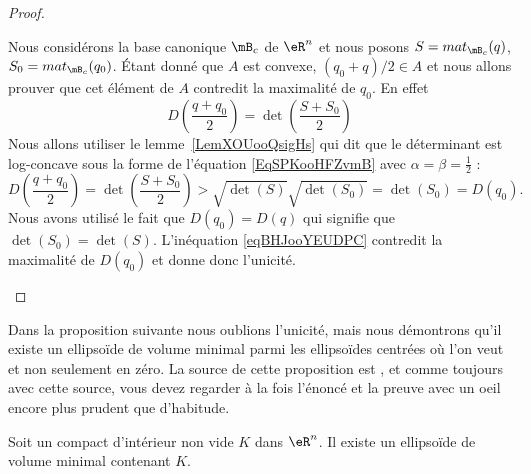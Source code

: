 \begin{proof}
\begin{subproof}
            Nous considérons la base canonique \( \mB_c\) de \( \eR^n\) et nous posons \( S=mat_{\mB_c}(q)\), \( S_0=mat_{\mB_c}(q_0)\). Étant donné que \( A\) est convexe, \( (q_0+q)/2\in A\) et nous allons prouver que cet élément de \( A\) contredit la maximalité de \( q_0\). En effet
            \begin{equation}
                D\left( \frac{ q+q_0 }{ 2 }\right)=\det\left( \frac{ S+S_0 }{2} \right)
            \end{equation}
            Nous allons utiliser le lemme~\ref{LemXOUooQsigHs} qui dit que le déterminant est log-concave sous la forme de l'équation \eqref{EqSPKooHFZvmB} avec \( \alpha=\beta=\frac{ 1 }{2}\) :
            \begin{equation}    \label{eqBHJooYEUDPC}
                D\left( \frac{ q+q_0 }{ 2 }\right)=\det\left( \frac{ S+S_0 }{2} \right)>\sqrt{\det(S)}\sqrt{\det(S_0)}=\det(S_0)=D(q_0).
            \end{equation}
            Nous avons utilisé le fait que \( D(q_0)=D(q)\) qui signifie que \( \det(S_0)=\det(S)\). L'inéquation \eqref{eqBHJooYEUDPC} contredit la maximalité de \( D(q_0)\) et donne donc l'unicité.
    \end{subproof}
\end{proof}

Dans la proposition suivante nous oublions l'unicité, mais nous démontrons qu'il existe un ellipsoïde de volume minimal parmi les ellipsoïdes centrées où l'on veut et non seulement en zéro. La source de cette proposition est \cite{MonCerveau}, et comme toujours avec cette source, vous devez regarder à la fois l'énoncé et la preuve avec un oeil encore plus prudent que d'habitude.
\begin{proposition}      \label{PROPooVIDPooOGrRJh}
    Soit un compact d'intérieur non vide \( K\) dans \( \eR^n\). Il existe un ellipsoïde de volume minimal contenant \( K\).
\end{proposition}

